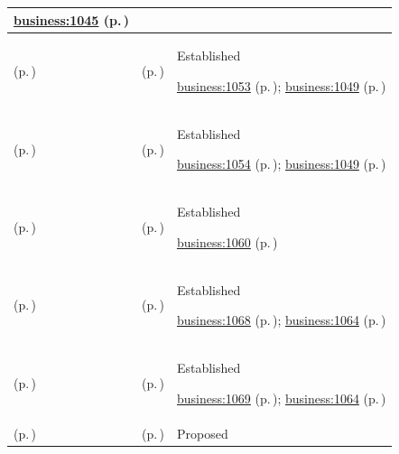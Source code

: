 \begin{longtable}{|>{\raggedright\arraybackslash}p{0.27\TableWidth}|>{\raggedright\arraybackslash}p{0.27\TableWidth}|>{\raggedright\arraybackslash}p{0.46\TableWidth}|}
 \hyperref[rad:business:1045]{business:1045} (p.\,\pageref{rad:business:1045})\\\hline
\nameref{cap:bc-health-service-assurance-specification} (p.\,\pageref{cap:bc-health-service-assurance-specification}) & \nameref{cap:bc-assurance-approach-definition} (p.\,\pageref{cap:bc-assurance-approach-definition}) & Established

 \hyperref[rad:business:1051]{business:1053} (p.\,\pageref{rad:business:1051}); \hyperref[rad:business:1049]{business:1049} (p.\,\pageref{rad:business:1049})\\\hline
\nameref{cap:bc-health-service-assurance-specification} (p.\,\pageref{cap:bc-health-service-assurance-specification}) & \nameref{cap:bc-assurance-evaluation-criteria-governance} (p.\,\pageref{cap:bc-assurance-evaluation-criteria-governance}) & Established

 \hyperref[rad:business:1051]{business:1054} (p.\,\pageref{rad:business:1051}); \hyperref[rad:business:1049]{business:1049} (p.\,\pageref{rad:business:1049})\\\hline
\nameref{cap:bc-health-service-assurance} (p.\,\pageref{cap:bc-health-service-assurance}) & \nameref{cap:bc-assurance-evaluation} (p.\,\pageref{cap:bc-assurance-evaluation}) & Established

 \hyperref[rad:business:1060]{business:1060} (p.\,\pageref{rad:business:1060})\\\hline
\nameref{cap:bc-assurance-evaluation} (p.\,\pageref{cap:bc-assurance-evaluation}) & \nameref{cap:bc-assurance-evidence-assessment} (p.\,\pageref{cap:bc-assurance-evidence-assessment}) & Established

 \hyperref[rad:business:1066]{business:1068} (p.\,\pageref{rad:business:1066}); \hyperref[rad:business:1064]{business:1064} (p.\,\pageref{rad:business:1064})\\\hline
\nameref{cap:bc-assurance-evaluation} (p.\,\pageref{cap:bc-assurance-evaluation}) & \nameref{cap:bc-assurance-conclusion-determination} (p.\,\pageref{cap:bc-assurance-conclusion-determination}) & Established

 \hyperref[rad:business:1066]{business:1069} (p.\,\pageref{rad:business:1066}); \hyperref[rad:business:1064]{business:1064} (p.\,\pageref{rad:business:1064})\\\hline
\nameref{cap:bc-service-delivery-preparedness-management} (p.\,\pageref{cap:bc-service-delivery-preparedness-management}) & \nameref{cap:bc-health-service-operational-readiness} (p.\,\pageref{cap:bc-health-service-operational-readiness}) & Proposed


\end{longtable}
